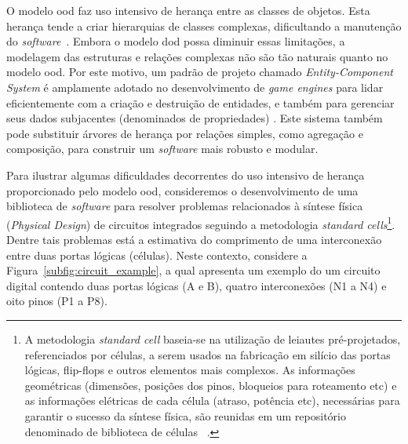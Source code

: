 O modelo \ac{ood} faz uso intensivo de herança entre as classes de objetos.
Esta herança tende a criar hierarquias de classes complexas, dificultando a manutenção do \textit{software}~\cite{nystrom2014game}. 
Embora o modelo \ac{dod} possa diminuir essas limitações, a modelagem das estruturas e relações complexas não são tão naturais quanto no modelo \ac{ood}.
Por este motivo, um padrão de projeto chamado \textit{Entity-Component System} é amplamente adotado no desenvolvimento de \textit{game engines} para lidar eficientemente com a criação e destruição de entidades, e também para gerenciar seus dados subjacentes (denominados de propriedades) \cite{wiebusch2015decoupling, zu2014campvis}.
Este sistema também pode substituir árvores de herança por relações simples, como agregação e composição, para construir um \textit{software} mais robusto e modular.

Para ilustrar algumas dificuldades decorrentes do uso intensivo de herança proporcionado pelo modelo \ac{ood}, consideremos o desenvolvimento de uma biblioteca de \textit{software} para resolver problemas relacionados à síntese física (\textit{Physical Design}) de circuitos integrados seguindo a metodologia \textit{standard cells}\footnote{A metodologia \textit{standard cell} baseia-se na utilização de leiautes pré-projetados, referenciados por células, a serem usados na fabricação em silício das portas lógicas, flip-flops e outros elementos mais complexos. As informações geométricas (dimensões, posições dos pinos, bloqueios para roteamento etc) e as informações elétricas de cada célula (atraso, potência etc), necessárias para garantir o sucesso da síntese física, são reunidas em um repositório denominado de biblioteca de células ~\cite{kahng2011vlsi}.}.
Dentre tais problemas está a estimativa do comprimento de uma interconexão entre duas portas lógicas (células).
Neste contexto, considere a Figura~\ref{subfig:circuit_example}, a qual apresenta um exemplo do um circuito digital contendo duas portas lógicas (A e B), quatro interconexões (N1 a N4) e oito pinos (P1 a P8).

